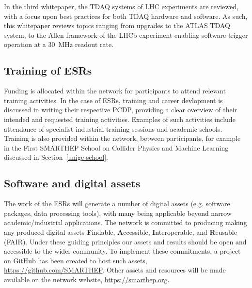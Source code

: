 In the third whitepaper, the TDAQ systems of LHC experiments are reviewed, with a focus upon best practices for both TDAQ hardware and software. As such, this whitepaper reviews topics ranging from upgrades to the ATLAS TDAQ system, to the Allen framework of the LHCb experiment enabling software trigger operation at a 30~MHz readout rate. \cite{ATLAS-TDAQ, LHCb-Allen}\par


\subsection{Training of ESRs}
\label{training}
Funding is allocated within the network for participants to attend relevant training activities. In the case of ESRs, training and career devlopment is discussed in writing their respective PCDP, providing a clear overview of their intended and requested training activities. Examples of such activities include attendance of specialist industrial training sessions and academic schools. Training is also provided within the network, between participants, for example in the First SMARTHEP School on Collider Physics and Machine Learning discussed in Section~\ref{unige-school}.

\subsection{Software and digital assets}
\label{software}
The work of the ESRs will generate a number of digital assets (e.g. software packages, data processing tools), with many being applicable beyond narrow academic/industrial applications. The network is committed to producing making any produced digital assets \textbf{F}indable, \textbf{A}ccessible, \textbf{I}nteroperable, and \textbf{R}eusable (FAIR). \cite{FAIR-principles} Under these guiding principles our assets and results should be open and accessible to the wider community. To implement these commitments, a project on GitHub has been created to host such assets, \url{https://github.com/SMARTHEP}. Other assets and resources will be made available on the network website, \url{https://smarthep.org}.